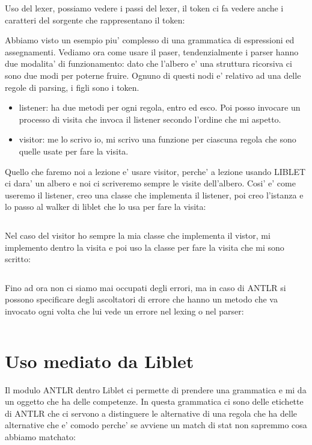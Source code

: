 
Uso del lexer, possiamo vedere i passi del lexer, il token ci fa vedere anche i caratteri del sorgente che rappresentano il token:


Abbiamo visto un esempio piu' complesso di una grammatica di espressioni ed assegnamenti. Vediamo ora come usare il paser, tendenzialmente i parser hanno due modalita' di funzionamento:
dato che l'albero e' una struttura ricorsiva ci sono due modi per poterne fruire. Ognuno di questi nodi e' relativo ad una delle regole di parsing, i figli sono i token.
\begin{itemize}
    \item listener: ha due metodi per ogni regola, entro ed esco. Poi posso invocare un processo di visita che invoca il listener secondo l'ordine che mi aspetto.
    \item visitor: me lo scrivo io, mi scrivo una funzione per ciascuna regola che sono quelle usate per fare la visita.
\end{itemize}

Quello che faremo noi a lezione e' usare visitor, perche' a lezione usando LIBLET ci dara' un albero e noi ci scriveremo sempre le visite dell'albero.
Cosi' e' come useremo il listener, creo una classe che implementa il listener, poi creo l'istanza e lo passo al walker di liblet che lo usa per fare la visita:
\begin{lstlisting}

\end{lstlisting}

Nel caso del visitor ho sempre la mia classe che implementa il vistor, mi implemento dentro la visita e poi uso la classe per fare la visita che mi sono scritto:
\begin{lstlisting}

\end{lstlisting}

Fino ad ora non ci siamo mai occupati degli errori, ma in caso di ANTLR si possono specificare degli ascoltatori di errore che hanno un metodo che va invocato ogni volta che lui vede un errore nel lexing o nel parser:
\begin{lstlisting}

\end{lstlisting}

\section{Uso mediato da Liblet}
Il modulo ANTLR dentro Liblet ci permette di prendere una grammatica e mi da un oggetto che ha delle competenze.
In questa grammatica ci sono delle etichette di ANTLR che ci servono a distinguere le alternative di una regola che ha delle alternative che e' comodo perche' se avviene un match di stat non sapremmo cosa abbiamo matchato:
\begin{lstlisting}

\end{lstlisting}

